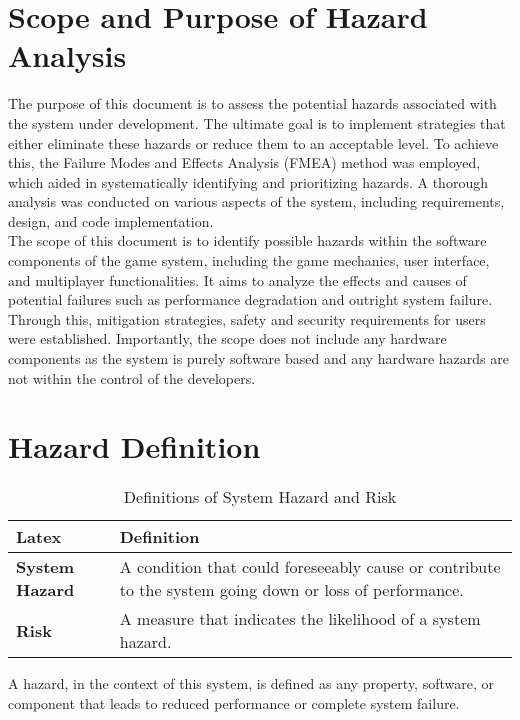 \documentclass{article}
\begin{document}
\section{Scope and Purpose of Hazard Analysis}

The purpose of this document is to assess the potential hazards associated with the system under development. The ultimate goal is to implement strategies that either eliminate these hazards or reduce them to an acceptable level. To achieve this, the Failure Modes and Effects Analysis (FMEA) method was employed, which aided in systematically identifying and prioritizing hazards. A thorough analysis was conducted on various aspects of the system, including requirements, design, and code implementation.\\

The scope of this document is to identify possible hazards within the software components of the game system, including the game mechanics, user interface, and multiplayer functionalities. It aims to analyze the effects and causes of potential failures such as performance degradation and outright system failure. Through this, mitigation strategies, safety and security requirements for users were established. Importantly, the scope does not include any hardware components as the system is purely software based and any hardware hazards are not within the control of the developers.

\section{Hazard Definition}

\begin{table}[H]
    \centering
    \begin{tabular}{|l|p{10cm}|}
    \hline
    \textbf{Latex} & \textbf{Definition} \\ \hline
    \textbf{System Hazard} & A condition that could foreseeably cause or contribute to the system going down or loss of performance. \\ \hline
    \textbf{Risk} & A measure that indicates the likelihood of a system hazard. \\ \hline
    \end{tabular}
    \caption{Definitions of System Hazard and Risk}
\end{table}

A hazard, in the context of this system, is defined as any property, software, or component that leads to reduced performance or complete system failure.
\end{document}
